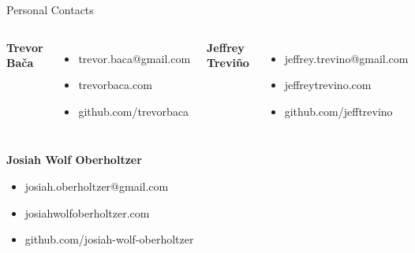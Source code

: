 \begin{frame}{Personal Contacts}
    \begin{columns}[t,onlytextwidth]
        \textbf{Trevor Ba\v{c}a}
        \begin{itemize}
            \item trevor.baca@gmail.com
            \item trevorbaca.com
            \item github.com/trevorbaca
        \end{itemize}
        \textbf{Jeffrey Trevi\~{n}o}
        \begin{itemize}
            \item jeffrey.trevino@gmail.com
            \item jeffreytrevino.com
            \item github.com/jefftrevino
        \end{itemize}
    \end{columns}
    \vspace{\baselineskip}
    \textbf{Josiah Wolf Oberholtzer}
    \begin{itemize}
        \item josiah.oberholtzer@gmail.com
        \item josiahwolfoberholtzer.com
        \item github.com/josiah-wolf-oberholtzer
    \end{itemize}
\end{frame}